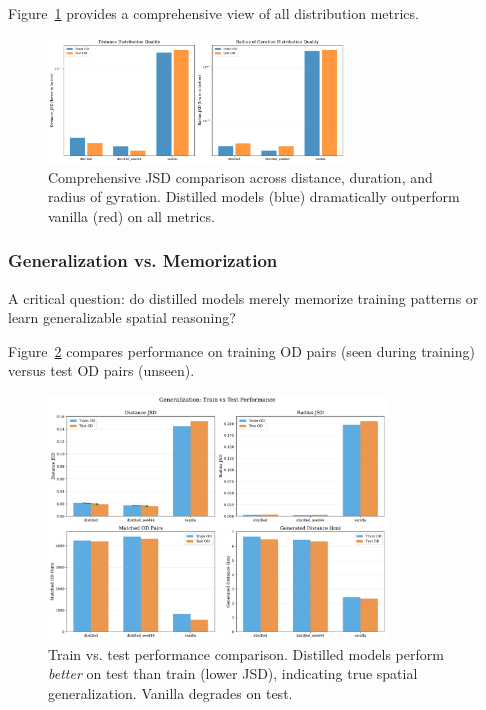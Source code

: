 Figure~\ref{fig:jsd-comparison} provides a comprehensive view of all distribution metrics.

\begin{figure}[h]
    \centering
    \includegraphics[width=0.7\textwidth]{assets/plots/hoser/jsd_comparison.pdf}
    \caption{Comprehensive JSD comparison across distance, duration, and radius of gyration. Distilled models (blue) dramatically outperform vanilla (red) on all metrics.}
    \label{fig:jsd-comparison}
\end{figure}

\subsubsection{Generalization vs. Memorization}

A critical question: do distilled models merely memorize training patterns or learn generalizable spatial reasoning?

Figure~\ref{fig:train-test} compares performance on training OD pairs (seen during training) versus test OD pairs (unseen).

\begin{figure}[h]
    \centering
    \includegraphics[width=0.8\textwidth]{assets/plots/hoser/train_test_comparison.pdf}
    \caption{Train vs. test performance comparison. Distilled models perform \emph{better} on test than train (lower JSD), indicating true spatial generalization. Vanilla degrades on test.}
    \label{fig:train-test}
\end{figure}

